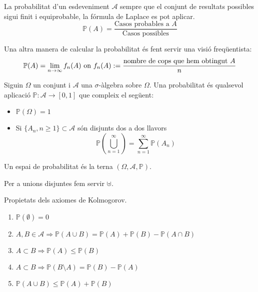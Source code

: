 \documentclass[../main.tex]{subfiles}
\begin{document}
    \begin{definicio}
        La probabilitat d'un esdeveniment $\mathcal{A}$ sempre que el conjunt de resultats possibles
        sigui finit i equiprobable, la fórmula de Laplace es pot aplicar.
        \begin{displaymath}
            \mathbb{P}(A) = \frac{\text{Casos probables a } A }{\text{Casos possibles}}
        \end{displaymath}
    \end{definicio}
    Una altra manera de calcular la probabilitat és fent servir una visió freqüentista:
    \begin{displaymath}
        \mathbb{P}(A) = \lim_{n\rightarrow\infty}f_n(A) \hbox{ on } f_n(A):= \frac{\text{nombre de cops que hem obtingut } A}{n}
    \end{displaymath}
    \begin{definicio}
        Siguin $\Omega$ un conjunt i $\mathcal{A}$ una $\sigma$-àlgebra sobre $\Omega$. Una
        probabilitat és qualsevol aplicació $\mathbb{P} : \mathcal{A} \longrightarrow [0,1]$ que
        compleix el següent:
        \begin{itemize}
            \item $\mathbb{P}(\Omega) = 1$
            \item Si $\{A_n, n\geq 1\} \subset \mathcal{A}$ són disjunts dos a dos llavors
            \begin{displaymath}
                \mathbb{P} (\bigcup\limits_{n=1}^\infty) = \sum\limits_{n=1}^{\infty}\mathbb{P}(A_n)
            \end{displaymath}
        \end{itemize}
    \end{definicio}
    \begin{definicio}
        Un espai de probabilitat és la terna $(\Omega, \mathcal{A}, \mathbb{P})$.
    \end{definicio}
    \begin{notacio}
        Per a unions disjuntes fem servir $\uplus$.
    \end{notacio}
    \begin{corolari} Propietats dels axiomes de Kolmogorov.
        \begin{enumerate}
            \item $\mathbb{P}(\emptyset) = 0$
            \item $A, B \in \mathcal{A} \Rightarrow \mathbb{P}(A\cup B) = \mathbb{P}(A) + \mathbb{P}(B) - \mathbb{P}(A \cap B)$
            \item $A \subset B \Rightarrow \mathbb{P}(A) \leq \mathbb{P}(B)$
            \item $A \subset B \Rightarrow \mathbb{P}(B\setminus A) = \mathbb{P}(B) - \mathbb{P}(A)$
            \item $\mathbb{P}(A\cup B) \leq \mathbb{P}(A) + \mathbb{P}(B)$
        \end{enumerate}
    \end{corolari}
\end{document}
